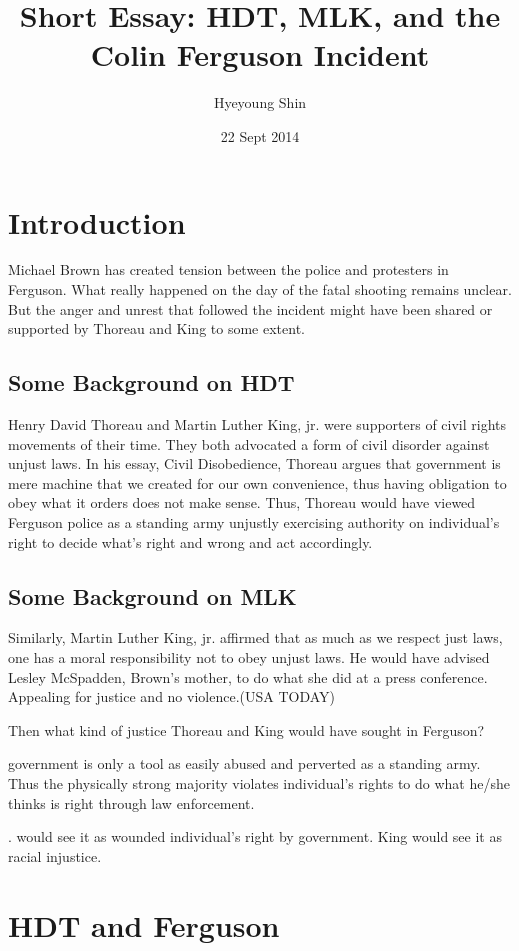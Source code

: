 \documentclass{article}
\author{Hyeyoung Shin}
\title{Short Essay: HDT, MLK, and the Colin Ferguson Incident}
\date{22 Sept 2014}
\begin{document}
\maketitle

\section{Introduction}

Michael Brown has created tension between the police and protesters in
Ferguson. What really happened on the day of the fatal shooting remains
unclear. But the anger and unrest that followed the incident might have been
shared or supported by Thoreau and King to some extent.  

\subsection{Some Background on HDT}

Henry David Thoreau and Martin Luther King, jr. were supporters of civil rights
movements of their time. They both advocated a form of civil disorder against
unjust laws. In his essay, Civil Disobedience, Thoreau argues that government is
mere machine that we created for our own convenience, thus having obligation to
obey what it orders does not make sense. Thus, Thoreau would have viewed
Ferguson police as a standing army unjustly exercising authority on
individual's right to decide what's right and wrong and act accordingly.  

\subsection{Some Background on MLK}
Similarly, Martin Luther King, jr. affirmed that as much as we respect just
laws, one has a moral responsibility not to obey unjust laws. He would have
advised Lesley McSpadden, Brown's mother, to do what she did at a press
conference. Appealing for justice and no violence.(USA TODAY) 

Then what kind of justice Thoreau and King would have sought in Ferguson?

government is only a tool as easily abused and perverted as a standing
army. Thus the physically strong majority violates individual's rights to do
what he/she thinks is right through law enforcement.  

. would see it as wounded individual's right by government. King would see it as
racial injustice.  

\section{HDT and Ferguson}
\end{document}
